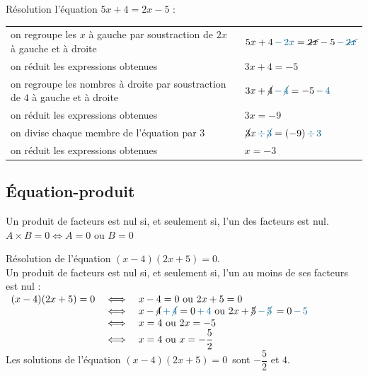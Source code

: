 \begin{exemple*1}
   Résolution l'équation $5x+4=2x-5$ : \\
   \begin{tabular}{p{11cm}p{4cm}}
      on regroupe les $x$ à gauche par soustraction de $2x$ à gauche et à droite & $5x+4\,\textcolor{A1}{-\,2x}=\cancel{2x}-5\,\textcolor{A1}{-\,\cancel{2x}}$ \\
      on réduit les expressions obtenues & $3x+4=-5$ \\
      on regroupe les nombres à droite par soustraction de $4$ à gauche et à droite & $3x+\cancel4\,\textcolor{A1}{-\,\cancel4}=-5\,\textcolor{A1}{-\,4}$ \\
      on réduit les expressions obtenues & $3x=-9$ \\
      on divise chaque membre de l'équation par $3$ & $\cancel3x\,\textcolor{A1}{\div\,\cancel3} =(-9)\,\textcolor{A1}{\div\,3}$ \\
      on réduit les expressions obtenues & $x=-3$ \\ [-5mm]
   \end{tabular}
\end{exemple*1}


\subsection{Équation-produit} %

\begin{propriete}
   Un produit de facteurs est nul si, et seulement si, l'un des facteurs est nul. \\
   \hspace*{4cm} $A\times B =0 \iff A =0 \text{ ou } B =0$ \smallskip
\end{propriete}

\begin{exemple*1}
   Résolution de l'équation $(x-4)(2x+5)=0$. \\
   Un produit de facteurs est nul si, et seulement si, l'un au moins de ses facteurs est nul : \\ [1mm]
   $\begin{array}{rcll}
      (x-4)(2x+5) = 0 & \iff & x-4 = 0 \text{ ou } 2x+5 = 0 \\
      & \iff & x- \cancel4 \textcolor{A1}{\,+\,\cancel4} = 0 \textcolor{A1}{\,+\,4} \text{ ou } 2x+\cancel5 \textcolor{A1}{\,- \,\cancel5\,} =0 \textcolor{A1}{\,- \,5} \\
      & \iff & x = 4 \text{ ou } 2x =-5 \\
      & \iff & x = 4 \text{ ou } x = -\dfrac52 \\
   \end{array}$ \\
   Les solutions de l'équation $(x-4)(2x+5) = 0\,$ sont $-\dfrac52$ et $4$. 
\end{exemple*1}


